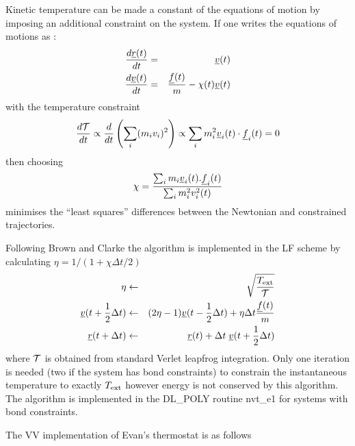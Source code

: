 Kinetic temperature can be made a constant of the equations of motion
by imposing an additional constraint on the system. If one writes the
equations of motions as :
\begin{eqnarray}
{d \mbox{$\underline{r}$}(t) \over d t}& =& \mbox{$\underline{v}$}(t)\nonumber \\
{d \mbox{$\underline{v}$}(t) \over d t}& =& {\mbox{$\underline{f}$}(t)\over m} - \chi(t) \mbox{$\underline{v}$}(t)\\
\end{eqnarray}
with the temperature constraint
\begin{equation}
{d{\cal T}\over dt} \propto {d \over dt}\left(\sum_i (m_i v_i)^2
\right) \propto \sum_i m_i^2
\mbox{$\underline{v}$}_i(t)\cdot\mbox{$\underline{f}$}_i(t) = 0
\end{equation}
then choosing
\begin{equation}
\chi = {\sum_i m_i \mbox{$\underline{v}$}_i(t).\mbox{$\underline{f}$}_i(t) \over \sum_i m_i^2 v_i^2(t)}
\end{equation}
minimises the ``least squares'' differences between the Newtonian and
constrained trajectories.  

Following Brown and Clarke \cite{brown-84a} the algorithm is
implemented in the LF scheme by calculating $\eta = 1/(1+ \chi\Delta t/2)$
\begin{eqnarray}
\eta&\leftarrow& \sqrt{{T_{\rm ext}\over {\cal T}}}\nonumber\\
\mbox{$\underline{v}$}(t+{1\over 2}\Delta t)& \leftarrow& (2\eta-1) \mbox{$\underline{v}$}(t-{1\over2}\Delta t) + \eta\Delta t {\mbox{$\underline{f}$}(t)\over m}
\nonumber\\
\mbox{$\underline{r}$}(t+\Delta t) &\leftarrow& \mbox{$\underline{r}$}(t) + \Delta t\; \mbox{$\underline{v}$}(t+{1\over 2}\Delta t)
\end{eqnarray}
where ${\cal T}$ is obtained from standard
Verlet leapfrog integration.  Only one
iteration is needed (two if the system has bond constraints) to
constrain the instantaneous temperature to exactly $T_{\rm ext}$
however energy is not conserved by this algorithm.  The algorithm is
implemented in the DL\_POLY routine {\sc nvt\_e1} for systems with
bond constraints.

The VV implementation of Evan's thermostat is as follows

